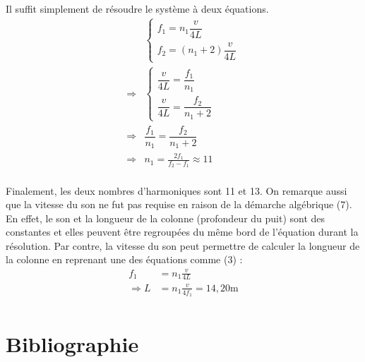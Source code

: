 \documentclass[11pt]{article}
\begin{document}
Il suffit simplement de résoudre le système à deux équations.
\begin{equation}
\begin{split}
&\begin{cases}
f_1=n_1\dfrac{v}{4L}\\f_2=(n_1+2)\dfrac{v}{4L}
\end{cases}\\
\Rightarrow
&\begin{cases}
\dfrac{v}{4L}=\dfrac{f_1}{n_1}\\\dfrac{v}{4L}=\dfrac{f_2}{n_1+2}
\end{cases}\\
\Rightarrow&\dfrac{f_1}{n_1}=\dfrac{f_2}{n_1+2}\\
\Rightarrow&n_1=\frac{2f_1}{f_2-f_1}\approx 11\\
\end{split}
\end{equation}

Finalement, les deux nombres d'harmoniques sont 11 et 13. On remarque aussi que la vitesse du son ne fut pas requise en raison de la démarche algébrique (7). En effet, le son et la longueur de la colonne (profondeur du puit) sont des constantes et elles peuvent être regroupées du même bord de l'équation durant la résolution. Par contre, la vitesse du son peut permettre de calculer la longueur de la colonne en reprenant une des équations comme (3) :
\begin{equation}
\begin{split}
f_1&=n_1\frac{v}{4L}\\
\Rightarrow L&=n_1\frac{v}{4f_1}=14,20\mathrm{m}\\
\end{split}
\end{equation}

\section*{Bibliographie}

\renewcommand{\section}[2]{}

\end{document}
